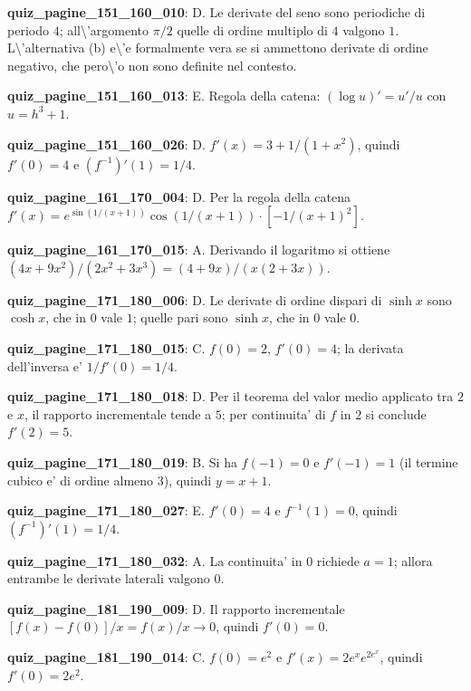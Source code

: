 \documentclass[11pt,a4paper]{article}
\newcounter{quiz}
\begin{document}
\noindent\textbf{quiz\_pagine\_151\_160\_010}: D. Le derivate del seno sono periodiche di periodo $4$; all\textbackslash{}'argomento $\pi/2$ quelle di ordine multiplo di $4$ valgono $1$. L\textbackslash{}'alternativa (b) e\textbackslash{}'e formalmente vera se si ammettono derivate di ordine negativo, che pero\textbackslash{}'o non sono definite nel contesto.\par\medskip
\noindent\textbf{quiz\_pagine\_151\_160\_013}: E. Regola della catena: $(\log u)\prime=u\prime/u$ con $u=h^3+1$.\par\medskip
\noindent\textbf{quiz\_pagine\_151\_160\_026}: D. $f\prime(x)=3+1/(1+x^2)$, quindi $f\prime(0)=4$ e $(f^{-1})\prime(1)=1/4$.\par\medskip
\noindent\textbf{quiz\_pagine\_161\_170\_004}: D. Per la regola della catena $f'(x)=e^{\sin(1/(x+1))}\cos(1/(x+1))\cdot[-1/(x+1)^2]$.\par\medskip
\noindent\textbf{quiz\_pagine\_161\_170\_015}: A. Derivando il logaritmo si ottiene $(4x+9x^2)/(2x^2+3x^3)=(4+9x)/(x(2+3x))$.\par\medskip
\noindent\textbf{quiz\_pagine\_171\_180\_006}: D. Le derivate di ordine dispari di $\sinh x$ sono $\cosh x$, che in $0$ vale $1$; quelle pari sono $\sinh x$, che in $0$ vale $0$.\par\medskip
\noindent\textbf{quiz\_pagine\_171\_180\_015}: C. $f(0)=2$, $f'(0)=4$; la derivata dell'inversa e' $1/f'(0)=1/4$.\par\medskip
\noindent\textbf{quiz\_pagine\_171\_180\_018}: D. Per il teorema del valor medio applicato tra $2$ e $x$, il rapporto incrementale tende a $5$; per continuita' di $f$ in $2$ si conclude $f'(2)=5$.\par\medskip
\noindent\textbf{quiz\_pagine\_171\_180\_019}: B. Si ha $f(-1)=0$ e $f'(-1)=1$ (il termine cubico e' di ordine almeno $3$), quindi $y=x+1$.\par\medskip
\noindent\textbf{quiz\_pagine\_171\_180\_027}: E. $f'(0)=4$ e $f^{-1}(1)=0$, quindi $(f^{-1})'(1)=1/4$.\par\medskip
\noindent\textbf{quiz\_pagine\_171\_180\_032}: A. La continuita' in $0$ richiede $a=1$; allora entrambe le derivate laterali valgono $0$.\par\medskip
\noindent\textbf{quiz\_pagine\_181\_190\_009}: D. Il rapporto incrementale $[f(x)-f(0)]/x=f(x)/x\to0$, quindi $f'(0)=0$.\par\medskip
\noindent\textbf{quiz\_pagine\_181\_190\_014}: C. $f(0)=e^2$ e $f'(x)=2e^xe^{2e^x}$, quindi $f'(0)=2e^2$.\par\medskip
\end{document}
